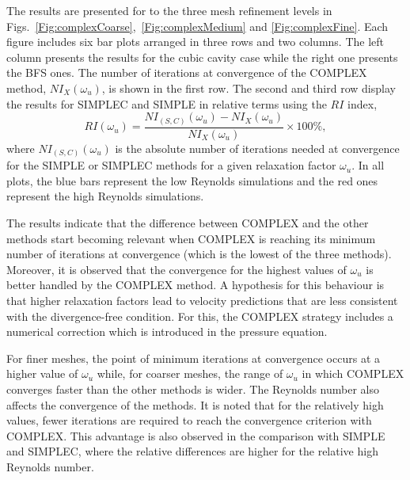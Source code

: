 \documentclass[final,3p,times,11pt,onecolumn]{myElsarticle}
\numberwithin{equation}{section}
\begin{document}
The results are presented for to the three mesh refinement levels in Figs.~\ref{Fig:complexCoarse},~\ref{Fig:complexMedium} and \ref{Fig:complexFine}. Each figure includes six bar plots arranged in three rows and two columns. The left column presents the results for the cubic cavity case while the right one presents the BFS ones. The number of iterations at convergence of the COMPLEX method, $NI_X(\omega_u)$, is shown in the first row. The second and third row display the results for SIMPLEC and SIMPLE in relative terms using the $RI$ index,
\begin{equation}
RI(\omega_u)
=
\dfrac
{NI_{(S,C)}(\omega_u) - NI_X(\omega_u)}
{NI_X(\omega_u)}
\times
100\%,
\end{equation}
where $NI_{(S,C)}(\omega_u)$ is the absolute number of iterations needed at convergence for the SIMPLE or SIMPLEC methods for a given relaxation factor $\omega_u$. 
In all plots, the blue bars represent the low Reynolds simulations and the red ones represent the high Reynolds simulations.

The results indicate that the difference between COMPLEX and the other methods start becoming relevant when COMPLEX is reaching its minimum number of iterations at convergence (which is the lowest of the three methods). Moreover, it is observed that the convergence for the highest values of $\omega_u$ is better handled by the COMPLEX method. A hypothesis for this behaviour is that higher relaxation factors lead to velocity predictions that are less consistent with the divergence-free condition. For this, the COMPLEX strategy includes a numerical correction which is introduced in the pressure equation.


For finer meshes, the point of minimum iterations at convergence occurs at a higher value of $\omega_u$ while, for coarser meshes, the range of $\omega_u$ in which COMPLEX converges faster than the other methods is wider. The Reynolds number also affects the convergence of the methods. It is noted that for the relatively high values, fewer iterations are required to reach the convergence criterion with COMPLEX. This advantage is also observed in the comparison with SIMPLE and SIMPLEC, where the relative differences are higher for the relative high Reynolds number.
\end{document}
